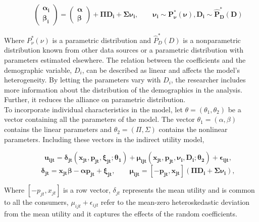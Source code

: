 \documentclass[a4paper,11pt]{article}
\begin{document}
    \begin{equation*}
        \qquad \mathbf{\begin{pmatrix}
            \alpha_{i}\\
            \beta_{i}
        \end{pmatrix} = \begin{pmatrix}
            \alpha\\
            \beta
        \end{pmatrix} + \Pi D_{i} + \Sigma \nu_{i}, \qquad \nu_{i} \sim P_{\nu}^{*}(\nu), D_{i} \sim \hat{P}_{D}^{*}(D)}
    \end{equation*}

    Where $P_{\nu}^{*}(\nu)$ is a parametric distribution and $\hat{P}_{D}^{*}(D)$ is a nonparametric distribution known from other data sources or a parametric distribution with parameters estimated elsewhere. The relation between the coefficients and the demographic variable, $D_{i}$, can be described as linear and affects the model's heterogeneity. By letting the parameters vary with $D_{i}$, the researcher includes more information about the distribution of the demographics in the analysis. Further, it reduces the alliance on parametric distribution.\\

    To incorporate individual characteristics in the model, let $\theta = (\theta_{1},\theta_{2})$ be a vector containing all the parameters of the model. The vector $\theta_{1} = (\alpha,\beta)$ contains the linear parameters and $\theta_{2} = (\Pi,\Sigma)$ contains the nonlinear parameters. Including these vectors in the indirect utility model,

    \begin{equation*}
        \qquad \mathbf{u_{ijt} = \delta_{jt}(x_{jt},p_{jt},\xi_{jt};\theta_{1}) + \mu_{ijt}(x_{jt},p_{jt},\nu_{i},D_{i};\theta_{2}) + \epsilon_{ijt},}
    \end{equation*}
    \begin{equation*}
        \qquad \mathbf{\delta_{jt} = x_{jt}\beta - \alpha p_{jt} + \xi_{jt}, \qquad
        \mu_{ijt} = [-p_{jt},x_{jt}](\Pi D_{i} + \Sigma \nu_{i}),}
    \end{equation*}

    Where $[-p_{jt},x_{jt}]$ is a row vector, $\delta_{jt}$ represents the mean utility and is common to all the consumers, $\mu_{ijt} + \epsilon_{ijt}$ refer to the mean-zero heteroskedastic deviation from the mean utility and it captures the effects of the random coefficients.\\
\end{document}
